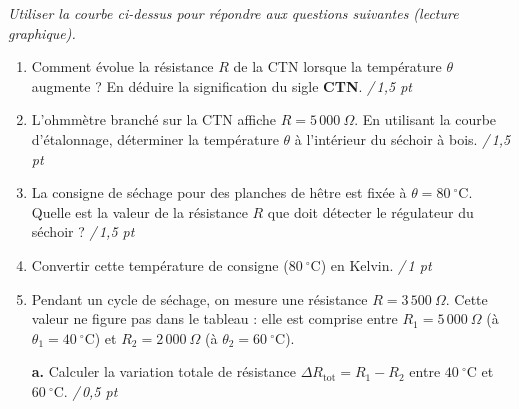 \documentclass[a4paper,11pt]{article}
\newcommand{\pt}[1]{\hfill\textcolor{gris}{\small\textit{/\,#1 pt}}}
\begin{document}
\vspace{2pt}
\begin{center}\small\itshape Utiliser la courbe ci-dessus pour répondre aux questions suivantes (lecture graphique).\end{center}

\newpage
{}

\vspace{4pt}
\begin{enumerate}[label=\textbf{\arabic*.},leftmargin=*,itemsep=4pt]

\item Comment évolue la résistance $R$ de la CTN lorsque la température $\theta$ augmente ? En déduire la signification du sigle \textbf{CTN}. \pt{1,5}

\vspace{1.4cm}

\item L'ohmmètre branché sur la CTN affiche $R = 5\,000\ \Omega$. En utilisant la courbe d'étalonnage, déterminer la température $\theta$ à l'intérieur du séchoir à bois. \pt{1,5}

\vspace{1.4cm}

\item La consigne de séchage pour des planches de hêtre est fixée à $\theta = 80\ ^\circ$C. Quelle est la valeur de la résistance $R$ que doit détecter le régulateur du séchoir ? \pt{1,5}

\vspace{1.4cm}

\item Convertir cette température de consigne ($80\ ^\circ$C) en Kelvin. \pt{1}

\vspace{1.2cm}

\item Pendant un cycle de séchage, on mesure une résistance $R = 3\,500\ \Omega$. Cette valeur ne figure pas dans le tableau : elle est comprise entre $R_1 = 5\,000\ \Omega$ (à $\theta_1 = 40\ ^\circ$C) et $R_2 = 2\,000\ \Omega$ (à $\theta_2 = 60\ ^\circ$C).\par
\vspace{4pt}
\textbf{a.} Calculer la variation totale de résistance $\Delta R_{\text{tot}} = R_1 - R_2$ entre $40\ ^\circ$C et $60\ ^\circ$C. \pt{0,5}

\vspace{1.2cm}


\end{enumerate}
\end{document}
